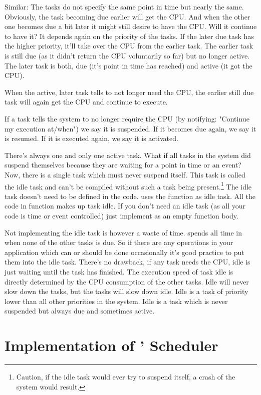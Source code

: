 Similar: The tasks do not specify the same point in time but nearly the
same. Obviously, the task becoming due earlier will get the CPU. And when
the other one becomes due a bit later it might still desire to have the
CPU. Will it continue to have it? It depends again on the priority of the
tasks. If the later due task has the higher priority, it'll take over the
CPU from the earlier task. The earlier task is still due (as it didn't
return the CPU voluntarily so far) but no longer active. The later task is
both, due (it's point in time has reached) and active (it got the CPU).

When the active, later task tells \rtos{} to not longer need the CPU, the
earlier still due task will again get the CPU and continue to execute.

If a task tells the system to no longer require the CPU (by notifying:
"Continue my execution at/when") we say it is suspended. If it becomes due
again, we say it is resumed. If it is executed again, we say it is
activated.

There's always one and only one active task. What if all tasks in the
system did suspend themselves because they are waiting for a point in time
or an event? Now, there is a single task which must never suspend itself.
This task is called the idle task and \rtos{} can't be compiled without
such a task being present.\footnote{Caution, if the idle task would ever
try to suspend itself, a crash of the system would result.} The idle task
doesn't need to be defined in the code. \rtos{} uses the function
 as idle task. All the code in function  makes up
task idle. If you don't need an idle task (as all your code is time or
event controlled) just implement  as an empty function body.

Not implementing the idle task is however a waste of time. \rtos{} spends
all time in  when none of the other tasks is due. So if there
are any operations in your application which can or should be done
occasionally it's good practice to put them into the idle task. There's no
drawback, if any task needs the CPU, idle is just waiting until the task
has finished. The execution speed of task idle is directly determined by
the CPU consumption of the other tasks. Idle will never slow down the
tasks, but the tasks will slow down idle. Idle is a task of priority lower
than all other priorities in the system. Idle is a task which is never
suspended but always due and sometimes active.


\section{Implementation of \rtos' Scheduler}
\label{secScheduler}

